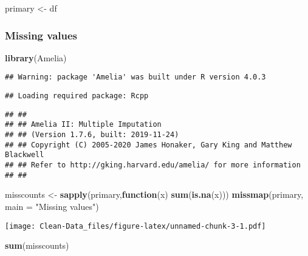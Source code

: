 \documentclass[
]{article}
\newenvironment{Shaded}{\begin{snugshade}}{\end{snugshade}}
\newcommand{\ControlFlowTok}[1]{\textcolor[rgb]{0.13,0.29,0.53}{\textbf{#1}}}
\newcommand{\DataTypeTok}[1]{\textcolor[rgb]{0.13,0.29,0.53}{#1}}
\newcommand{\KeywordTok}[1]{\textcolor[rgb]{0.13,0.29,0.53}{\textbf{#1}}}
\newcommand{\NormalTok}[1]{#1}
\newcommand{\StringTok}[1]{\textcolor[rgb]{0.31,0.60,0.02}{#1}}
\begin{document}
\begin{Shaded}
\begin{Highlighting}[]
\NormalTok{primary <-}\StringTok{ }\NormalTok{df}
\end{Highlighting}
\end{Shaded}

\hypertarget{missing-values}{%
\subsubsection{Missing values}\label{missing-values}}

\begin{Shaded}
\begin{Highlighting}[]
\KeywordTok{library}\NormalTok{(Amelia)}
\end{Highlighting}
\end{Shaded}

\begin{verbatim}
## Warning: package 'Amelia' was built under R version 4.0.3
\end{verbatim}

\begin{verbatim}
## Loading required package: Rcpp
\end{verbatim}

\begin{verbatim}
## ## 
## ## Amelia II: Multiple Imputation
## ## (Version 1.7.6, built: 2019-11-24)
## ## Copyright (C) 2005-2020 James Honaker, Gary King and Matthew Blackwell
## ## Refer to http://gking.harvard.edu/amelia/ for more information
## ##
\end{verbatim}

\begin{Shaded}
\begin{Highlighting}[]
\NormalTok{misscounts <-}\StringTok{ }\KeywordTok{sapply}\NormalTok{(primary,}\ControlFlowTok{function}\NormalTok{(x) }\KeywordTok{sum}\NormalTok{(}\KeywordTok{is.na}\NormalTok{(x)))}
\KeywordTok{missmap}\NormalTok{(primary, }\DataTypeTok{main =} \StringTok{"Missing values"}\NormalTok{)}
\end{Highlighting}
\end{Shaded}

\texttt{[image: Clean-Data\_files/figure-latex/unnamed-chunk-3-1.pdf]}

\begin{Shaded}
\begin{Highlighting}[]
\KeywordTok{sum}\NormalTok{(misscounts)}
\end{Highlighting}
\end{Shaded}
\end{document}
